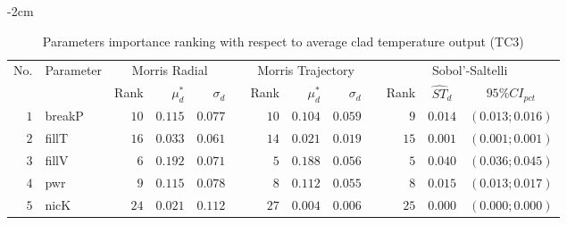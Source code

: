 \begin{table*}[!htbp]\centering
{}
\begin{adjustwidth*}{}{-2cm}
\caption{Parameters importance ranking with respect to average clad temperature output (TC$3$)}
\label{tab:app_screening_tc3_average}
\begin{tabular}{@{}rlrrrrrrrrrcc@{}}\toprule
\multirow{2}{*}{\footnotesize{No.}} & \multirow{2}{*}{\footnotesize{Parameter}} & \multicolumn{3}{c}{\footnotesize{Morris Radial}} & \phantom{a} & \multicolumn{3}{c}{\footnotesize{Morris Trajectory}}  &\phantom{a}& \multicolumn{3}{c}{\footnotesize{Sobol'-Saltelli}}                               \\             
                                                                                  \cmidrule{3-5}                                                   \cmidrule{7-9}                                                      \cmidrule{11-13}
                                    &                                           & \footnotesize{Rank}   & $\mu^*_d$ & $\sigma_d$   &             & \footnotesize{Rank} & $\mu^*_d$ & $\sigma_d$          &           & \footnotesize{Rank} & \footnotesize{$\hat{ST}_d$} & \footnotesize{$95\%CI_{pct}$}\\ \midrule
\footnotesize{$1 $} & \footnotesize{breakP   } & \footnotesize{$10$} & \footnotesize{$0.115$} & \footnotesize{$0.077$} && \footnotesize{$10$} & \footnotesize{$0.104$} & \footnotesize{$0.059$} && \footnotesize{$9 $} & \footnotesize{$0.014$} & \footnotesize{$(0.013;0.016)$} \\
\footnotesize{$2 $} & \footnotesize{fillT    } & \footnotesize{$16$} & \footnotesize{$0.033$} & \footnotesize{$0.061$} && \footnotesize{$14$} & \footnotesize{$0.021$} & \footnotesize{$0.019$} && \footnotesize{$15$} & \footnotesize{$0.001$} & \footnotesize{$(0.001;0.001)$} \\
\footnotesize{$3 $} & \footnotesize{fillV    } & \footnotesize{$6 $} & \footnotesize{$0.192$} & \footnotesize{$0.071$} && \footnotesize{$5 $} & \footnotesize{$0.188$} & \footnotesize{$0.056$} && \footnotesize{$5 $} & \footnotesize{$0.040$} & \footnotesize{$(0.036;0.045)$} \\
\footnotesize{$4 $} & \footnotesize{pwr      } & \footnotesize{$9 $} & \footnotesize{$0.115$} & \footnotesize{$0.078$} && \footnotesize{$8 $} & \footnotesize{$0.112$} & \footnotesize{$0.055$} && \footnotesize{$8 $} & \footnotesize{$0.015$} & \footnotesize{$(0.013;0.017)$} \\
\footnotesize{$5 $} & \footnotesize{nicK     } & \footnotesize{$24$} & \footnotesize{$0.021$} & \footnotesize{$0.112$} && \footnotesize{$27$} & \footnotesize{$0.004$} & \footnotesize{$0.006$} && \footnotesize{$25$} & \footnotesize{$0.000$} & \footnotesize{$(0.000;0.000)$} \\

\end{tabular}
\end{adjustwidth*}
\end{table*}
